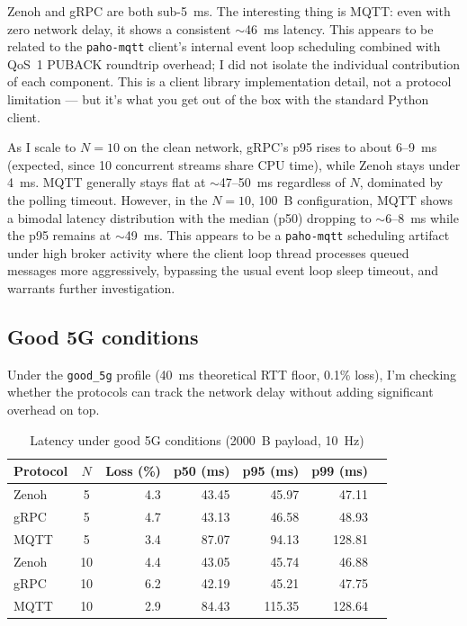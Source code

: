 \documentclass[11pt,a4paper]{article}
\begin{document}
Zenoh and gRPC are both sub-5~ms. The interesting thing is MQTT: even with zero network delay, it shows a consistent $\sim$46~ms latency. This appears to be related to the \texttt{paho-mqtt} client's internal event loop scheduling combined with QoS~1 PUBACK roundtrip overhead; I did not isolate the individual contribution of each component. This is a client library implementation detail, not a protocol limitation --- but it's what you get out of the box with the standard Python client.

As I scale to $N=10$ on the clean network, gRPC's p95 rises to about 6--9~ms (expected, since 10 concurrent streams share CPU time), while Zenoh stays under 4~ms. MQTT generally stays flat at $\sim$47--50~ms regardless of $N$, dominated by the polling timeout. However, in the $N=10$, 100~B configuration, MQTT shows a bimodal latency distribution with the median (p50) dropping to $\sim$6--8~ms while the p95 remains at $\sim$49~ms. This appears to be a \texttt{paho-mqtt} scheduling artifact under high broker activity where the client loop thread processes queued messages more aggressively, bypassing the usual event loop sleep timeout, and warrants further investigation.

\subsection{Good 5G conditions}

Under the \texttt{good\_5g} profile (40~ms theoretical RTT floor, 0.1\% loss), I'm checking whether the protocols can track the network delay without adding significant overhead on top.

\begin{table}[H]
\centering
\caption{Latency under good 5G conditions (2000~B payload, 10~Hz)}
\label{tab:good5g}
\begin{tabular}{lcrrrrr}
\toprule
Protocol & $N$ & Loss (\%) & p50 (ms) & p95 (ms) & p99 (ms) \\
\midrule
Zenoh & 5  & 4.3 & 43.45 & 45.97 & 47.11 \\
gRPC  & 5  & 4.7 & 43.13 & 46.58 & 48.93 \\
MQTT  & 5  & 3.4 & 87.07 & 94.13 & 128.81 \\
\midrule
Zenoh & 10 & 4.4 & 43.05 & 45.74 & 46.88 \\
gRPC  & 10 & 6.2 & 42.19 & 45.21 & 47.75 \\
MQTT  & 10 & 2.9 & 84.43 & 115.35 & 128.64 \\
\bottomrule
\end{tabular}
\end{table}
\end{document}
